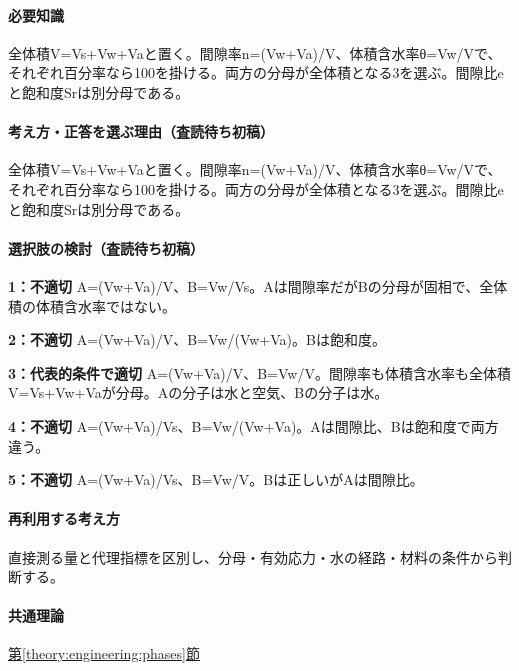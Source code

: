 \paragraph{必要知識} 全体積V=\allowbreak{}Vs+Vw+Vaと置く。間隙率n=\allowbreak{}(Vw+Va)/V、体積含水率θ=Vw/Vで、それぞれ百分率なら100を掛ける。両方の分母が全体積となる3を選ぶ。間隙比eと飽和度Srは別分母である。

\paragraph{考え方・正答を選ぶ理由（査読待ち初稿）} 全体積V=\allowbreak{}Vs+Vw+Vaと置く。間隙率n=\allowbreak{}(Vw+Va)/V、体積含水率θ=Vw/Vで、それぞれ百分率なら100を掛ける。両方の分母が全体積となる3を選ぶ。間隙比eと飽和度Srは別分母である。

\paragraph{選択肢の検討（査読待ち初稿）}\mbox{}\par

\noindent\textbf{1：不適切} A=\allowbreak{}(Vw+Va)/V、B=\allowbreak{}Vw/Vs。Aは間隙率だがBの分母が固相で、全体積の体積含水率ではない。\par

\noindent\textbf{2：不適切} A=\allowbreak{}(Vw+Va)/V、B=\allowbreak{}Vw/(Vw+Va)。Bは飽和度。\par

\noindent\textbf{3：代表的条件で適切} A=\allowbreak{}(Vw+Va)/V、B=\allowbreak{}Vw/V。間隙率も体積含水率も全体積V=\allowbreak{}Vs+Vw+Vaが分母。Aの分子は水と空気、Bの分子は水。\par

\noindent\textbf{4：不適切} A=\allowbreak{}(Vw+Va)/Vs、B=\allowbreak{}Vw/(Vw+Va)。Aは間隙比、Bは飽和度で両方違う。\par

\noindent\textbf{5：不適切} A=\allowbreak{}(Vw+Va)/Vs、B=\allowbreak{}Vw/V。Bは正しいがAは間隙比。\par

\paragraph{再利用する考え方} 直接測る量と代理指標を区別し、分母・有効応力・水の経路・材料の条件から判断する。

\paragraph{共通理論} \hyperref[theory:engineering:phases]{第\ref*{theory:engineering:phases}節}

